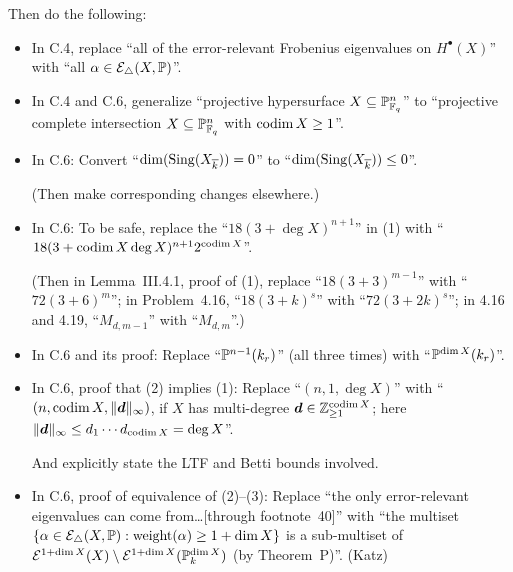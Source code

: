 \documentclass[12pt]{article}
\begin{document}
\begin{itemize}
    Then do the following:
    \begin{itemize}
        \item In C.4,
        replace ``all of the error-relevant Frobenius eigenvalues on $H^\bullet(X)$'' with ``all $\alpha\in \mathcal{E}_{\triangle}(X,\mathbb{P})$''.
    
        \item In C.4 and C.6,
        generalize ``projective hypersurface $X\subseteq \mathbb{P}^n_{\mathbb{F}_q}$'' to ``projective complete intersection $X\subseteq \mathbb{P}^n_{\mathbb{F}_q}$ with $\operatorname{codim}{X}\geq 1$''.
        
        \item In C.6:
        Convert ``$\dim(\operatorname{Sing}(X_{\overline{k}}))=0$'' to ``$\dim(\operatorname{Sing}(X_{\overline{k}}))\leq 0$''.
        
        (Then make corresponding changes elsewhere.)
        
        \item In C.6:
        To be safe, replace the ``$18(3+\deg{X})^{n+1}$'' in (1) with ``$18(3+\operatorname{codim}{X}\deg{X})^{n+1}2^{\operatorname{codim}{X}}$''.
        
        (Then in Lemma~III.4.1, proof of (1),
        replace ``$18(3+3)^{m-1}$'' with ``$72(3+6)^m$'';
        in Problem~4.16,
        ``$18(3+k)^s$'' with ``$72(3+2k)^s$'';
        in 4.16 and 4.19,
        ``$M_{d,m-1}$'' with ``$M_{d,m}$''.)
        
        \item In C.6 and its proof:
        Replace ``$\mathbb{P}^{n-1}(k_r)$'' (all three times) with ``$\mathbb{P}^{\dim{X}}(k_r)$''.
        
        \item In C.6, proof that (2) implies (1):
        Replace ``$(n,1,\deg{X})$'' with ``$(n,\operatorname{codim}{X},\lVert \bm{d} \rVert_\infty)$,
        if $X$ has multi-degree $\bm{d}\in \mathbb{Z}_{\geq 1}^{\operatorname{codim}{X}}$;
        here $\lVert \bm{d} \rVert_\infty\leq d_1\cdots d_{\operatorname{codim}{X}} = \deg{X}$''.
        
        And explicitly state the LTF and Betti bounds involved.
        
        \item In C.6, proof of equivalence of (2)--(3):
        Replace ``the only error-relevant eigenvalues can come from\dots [through footnote~40]'' with ``the multiset $\{\alpha\in \mathcal{E}_{\triangle}(X,\mathbb{P}): \operatorname{weight}(\alpha)\geq 1+\dim{X}\}$
        is a sub-multiset of $\mathcal{E}^{1+\dim{X}}(X)\setminus \mathcal{E}^{1+\dim{X}}(\mathbb{P}^{\dim{X}}_k)$ (by Theorem~P)''.
        (Katz)
        

\end{itemize}
\end{itemize}
\end{document}
